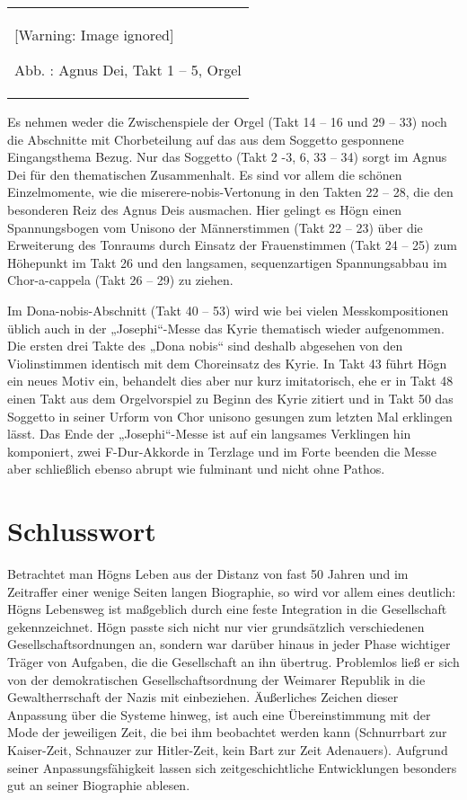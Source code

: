 \documentclass[a4paper]{article}
\newcounter{Abb}
\renewcommand\theAbb{\arabic{Abb}}
\begin{document}
\begin{center}
\tablefirsthead{}
\tablehead{}
\tabletail{}
\tablelasttail{}
\begin{supertabular}{m{12.107cm}}
  [Warning: Image ignored] %
 
Abb. \stepcounter{Abb}{\theAbb}: Agnus Dei, Takt 1 – 5, Orgel\\
\end{supertabular}
\end{center}
Es nehmen weder die Zwischenspiele der Orgel (Takt 14 – 16 und 29 – 33)
noch die Abschnitte mit Chorbeteilung auf das aus dem Soggetto
gesponnene Eingangsthema Bezug. Nur das Soggetto (Takt 2 -3, 6, 33 –
34) sorgt im Agnus Dei für den thematischen Zusammenhalt. Es sind vor
allem die schönen Einzelmomente, wie die miserere-nobis-Vertonung in
den Takten 22 – 28, die den besonderen Reiz des Agnus Deis ausmachen.
Hier gelingt es Högn einen Spannungsbogen vom Unisono der Männerstimmen
(Takt 22 – 23) über die Erweiterung des Tonraums durch Einsatz der
Frauenstimmen (Takt 24 – 25) zum Höhepunkt im Takt 26 und den
langsamen, sequenzartigen Spannungsabbau im Chor-a-cappela (Takt 26 –
29) zu ziehen. 

Im Dona-nobis-Abschnitt (Takt 40 – 53) wird wie bei vielen
Messkompositionen üblich auch in der „Josephi“-Messe das Kyrie
thematisch wieder aufgenommen. Die ersten drei Takte des „Dona nobis“
sind deshalb abgesehen von den Violinstimmen identisch mit dem
Choreinsatz des Kyrie. In Takt 43 führt Högn ein neues Motiv ein,
behandelt dies aber nur kurz imitatorisch, ehe er in Takt 48 einen Takt
aus dem Orgelvorspiel zu Beginn des Kyrie zitiert und in Takt 50 das
Soggetto in seiner Urform von Chor unisono gesungen zum letzten Mal
erklingen lässt. Das Ende der „Josephi“-Messe ist auf ein langsames
Verklingen hin komponiert, zwei F-Dur-Akkorde in Terzlage und im Forte
beenden die Messe aber schließlich ebenso abrupt wie fulminant und
nicht ohne Pathos.

\section{Schlusswort}
\hypertarget{RefHeadingToc100333756}{}Betrachtet man Högns Leben aus der
Distanz von fast 50 Jahren und im Zeitraffer einer wenige Seiten langen
Biographie, so wird vor allem eines deutlich: Högns Lebensweg ist
maßgeblich durch eine feste Integration in die Gesellschaft
gekennzeichnet. Högn passte sich nicht nur vier grundsätzlich
verschiedenen Gesellschaftsordnungen an, sondern war darüber hinaus in
jeder Phase wichtiger Träger von Aufgaben, die die Gesellschaft an ihn
übertrug. Problemlos ließ er sich von der demokratischen
Gesellschaftsordnung der Weimarer Republik in die Gewaltherrschaft der
Nazis mit einbeziehen. Äußerliches Zeichen dieser Anpassung über die
Systeme hinweg, ist auch eine Übereinstimmung mit der Mode der
jeweiligen Zeit, die bei ihm beobachtet werden kann (Schnurrbart zur
Kaiser-Zeit, Schnauzer zur Hitler-Zeit, kein Bart zur Zeit Adenauers).
Aufgrund seiner Anpassungsfähigkeit lassen sich zeitgeschichtliche
Entwicklungen besonders gut an seiner Biographie ablesen.
\end{document}
